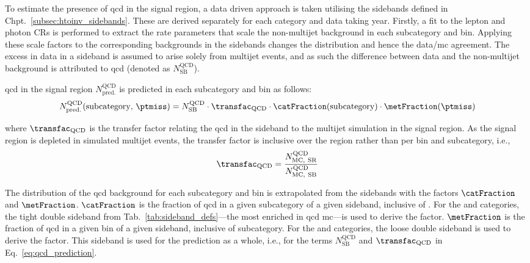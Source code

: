 To estimate the presence of \acrshort{qcd} in the signal region, a data driven approach is taken utilising the sidebands defined in Chpt.~\ref{subsec:htoinv_sidebands}. These are derived separately for each category and data taking year. Firstly, a fit to the lepton and photon \glspl{CR} is performed to extract the rate parameters that scale the non-multijet background in each subcategory and \ptmiss bin. Applying these scale factors to the corresponding backgrounds in the sidebands changes the distribution and hence the data/\acrshort{mc} agreement. The excess in data in a sideband is assumed to arise solely from multijet events, and as such the difference between data and the non-multijet background is attributed to \acrshort{qcd} (denoted as $N_{\mathrm{SB}}^{\mathrm{QCD}}$).

\acrshort{qcd} in the signal region $N_{\mathrm{pred.}}^{\mathrm{QCD}}$ is predicted in each subcategory and \ptmiss bin as follows: 
\begin{equation}
    N_{\mathrm{pred.}}^{\mathrm{QCD}}(\mathrm{subcategory}, \, \ptmiss) = N_{\mathrm{SB}}^{\mathrm{QCD}} \cdot \transfac_{\mathrm{QCD}} \cdot \catFraction(\mathrm{subcategory}) \cdot \metFraction(\ptmiss)
    \label{eq:qcd_prediction}
\end{equation}

where $\transfac_{\mathrm{QCD}}$ is the transfer factor relating the \acrshort{qcd} in the sideband to the multijet simulation in the signal region. As the signal region is depleted in simulated multijet events, the transfer factor is inclusive over the region rather than per \ptmiss bin and subcategory, i.e.,
\begin{equation}
    \transfac_{\mathrm{QCD}} = \frac{ N_{\mathrm{MC, \ SR}}^{\mathrm{QCD}} } { N_{\mathrm{MC, \ SB}}^{\mathrm{QCD}} }
    \label{eq:transfer_factor_qcd}
\end{equation}

The distribution of the \acrshort{qcd} background for each subcategory and \ptmiss bin is extrapolated from the sidebands with the factors $\catFraction$ and $\metFraction$. $\catFraction$ is the fraction of \acrshort{qcd} in a given subcategory of a given sideband, inclusive of \ptmiss. For the \ttH and \ggH categories, the tight double sideband from Tab.~\ref{tab:sideband_defs}---the most enriched in \acrshort{qcd} \acrshort{mc}---is used to derive the factor. $\metFraction$ is the fraction of \acrshort{qcd} in a given \ptmiss bin of a given sideband, inclusive of subcategory. For the \ttH and \ggH categories, the loose double sideband is used to derive the factor. This sideband is used for the prediction as a whole, i.e., for the terms $N_{\mathrm{SB}}^{\mathrm{QCD}}$ and $\transfac_{\mathrm{QCD}}$ in Eq.~\ref{eq:qcd_prediction}.

